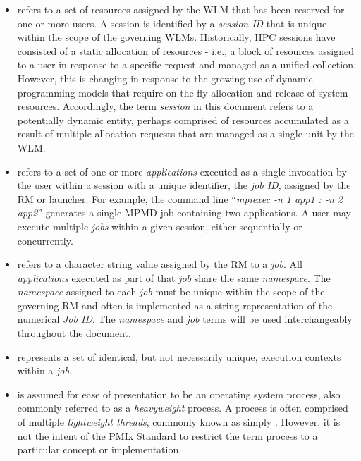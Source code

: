 \begin{itemize}

\item {} 
refers to a set of resources assigned by the \ac{WLM} that has been 
reserved for one or more users. 
A session is identified by a \emph{session ID} that is  
unique within the scope of the governing \acp{WLM}.
Historically, \ac{HPC} sessions have consisted of a static allocation of resources - i.e., a block of resources assigned to a user in response to a specific request and managed as a unified collection. However, this is changing in response to the growing use of dynamic programming models that require on-the-fly allocation and release of system resources. Accordingly, the term \emph{session} in this document refers to a potentially dynamic entity, perhaps comprised of resources accumulated as a result of multiple allocation requests that are managed as a single unit by the \ac{WLM}.

\item {} refers to a set of one or more \emph{applications} executed as a single invocation by the user within a session with a unique identifier, the \emph{job ID}, assigned by the \ac{RM} or launcher. For example, the command line ``\textit{mpiexec -n 1 app1 : -n 2 app2}'' generates a single \ac{MPMD} job containing two applications. A user may execute multiple \emph{jobs} within a given session, either sequentially or concurrently.

\item {} refers to a character string value assigned by the \ac{RM} to a \textit{job}.  All \textit{applications} executed as part of that \textit{job} share the same \emph{namespace}. The \emph{namespace} assigned to each \emph{job} must be unique within the scope of the governing \ac{RM} and often is implemented as a string representation of the numerical \emph{Job ID}. The \emph{namespace} and \emph{job} terms will be used interchangeably throughout the document.

\item {} represents a set of identical, but not necessarily unique,
execution contexts within a \emph{job}.

\item {} is assumed for ease of presentation to be an operating system process, also commonly referred to as a \emph{heavyweight} process. A process is often comprised of multiple \emph{lightweight threads}, commonly known as simply .  However, it is not the intent of the \ac{PMIx} Standard to restrict the term process to a particular concept or implementation.


\end{itemize}
